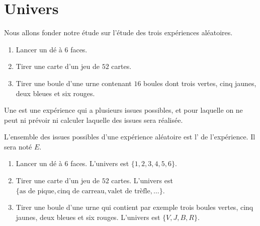 
\section{Univers}

Nous allons fonder notre étude sur l'étude des trois expériences aléatoires.
\begin{enumerate}
    \item
        Lancer un dé à \( 6\) faces.
    \item
        Tirer une carte d'un jeu de \( 52\) cartes.
    \item
        Tirer une boule d'une urne contenant \( 16\) boules dont trois vertes, cinq jaunes, deux bleues et six rouges.
\end{enumerate}

\begin{definition}
    Une  est une expérience qui a plusieurs issues possibles, et pour laquelle on ne peut ni prévoir ni calculer laquelle des issues sera réalisée.
\end{definition}

\begin{definition}
    L'ensemble des issues possibles d'une expérience aléatoire est l' de l'expérience. Il sera noté \( E\).
\end{definition}

\begin{enumerate}
    \item
        Lancer un dé à \( 6\) faces. L'univers est \( \{ 1,2,3,4,5,6 \}\).
    \item
        Tirer une carte d'un jeu de \( 52\) cartes. L'univers est \( \{ \text{as de pique},\text{cinq de carreau},\text{valet de trèfle}, \ldots \}\).
    \item
        Tirer une boule d'une urne qui contient par exemple trois boules vertes, cinq jaunes, deux bleues et six rouges. L'univers est \( \{ V,J,B,R \}\).
\end{enumerate}

